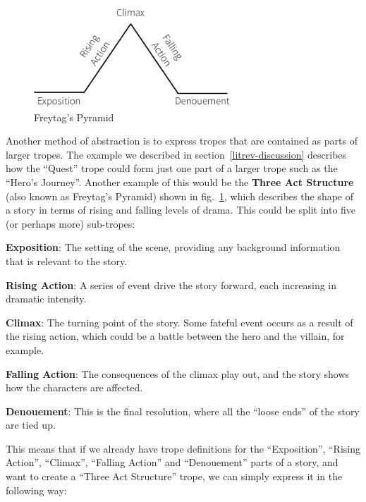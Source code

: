 \begin{figure}[!t]
\centerline{\includegraphics[height=1.5in]{freytag.png}}
\caption{Freytag's Pyramid} \label{fig:freytag}
\end{figure}

Another method of abstraction is to express tropes that are contained as parts
of larger tropes. The example we described in section~\ref{litrev-discussion}
describes how the ``Quest'' trope could form just one part of a larger trope
such as the ``Hero's Journey''. Another example of this would be the
\textbf{Three Act Structure} (also known as Freytag's Pyramid) shown in fig.~\ref{fig:freytag}, which describes the shape of a
story in terms of rising and falling levels of drama. This could be split into
five (or perhaps more) sub-tropes:

\begin{compactitem}
  \item \textbf{Exposition}: The setting of the scene, providing any background
    information that is relevant to the story.
  \item \textbf{Rising Action}: A series of event drive the story forward, each
    increasing in dramatic intensity.
  \item \textbf{Climax}: The turning point of the story. Some fateful event
    occurs as a result of the rising action, which could be a battle between the
    hero and the villain, for example.
  \item \textbf{Falling Action}: The consequences of the climax play out, and
    the story shows how the characters are affected.
  \item \textbf{Denouement}: This is the final resolution, where all the ``loose
    ends'' of the story are tied up.
\end{compactitem}

This means that if we already have trope definitions for the ``Exposition'',
``Rising Action'', ``Climax'', ``Falling Action'' and ``Denouement'' parts of a
story, and want to create a ``Three Act Structure'' trope, we can simply express
it in the following way:

